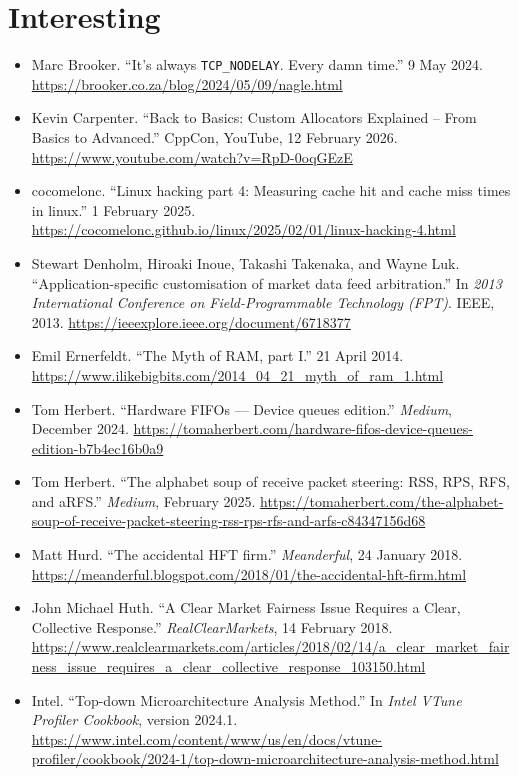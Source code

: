 \documentclass{article}
\begin{document}
\section{Interesting}
\begin{itemize}
	\item Marc Brooker. ``It's always \texttt{TCP\_NODELAY}. Every damn time.'' 9 May 2024. \url{https://brooker.co.za/blog/2024/05/09/nagle.html}
	\item Kevin Carpenter. ``Back to Basics: Custom Allocators Explained -- From Basics to Advanced.'' CppCon, YouTube, 12 February 2026. \url{https://www.youtube.com/watch?v=RpD-0oqGEzE}
	\item cocomelonc. ``Linux hacking part 4: Measuring cache hit and cache miss times in linux.'' 1 February 2025. \url{https://cocomelonc.github.io/linux/2025/02/01/linux-hacking-4.html}
	\item Stewart Denholm, Hiroaki Inoue, Takashi Takenaka, and Wayne Luk. ``Application-specific customisation of market data feed arbitration.'' In \textit{2013 International Conference on Field-Programmable Technology (FPT)}. IEEE, 2013. \url{https://ieeexplore.ieee.org/document/6718377}
	\item Emil Ernerfeldt. ``The Myth of RAM, part I.'' 21 April 2014. \url{https://www.ilikebigbits.com/2014_04_21_myth_of_ram_1.html}
	\item Tom Herbert. ``Hardware FIFOs --- Device queues edition.'' \textit{Medium}, December 2024. \url{https://tomaherbert.com/hardware-fifos-device-queues-edition-b7b4ec16b0a9}
	\item Tom Herbert. ``The alphabet soup of receive packet steering: RSS, RPS, RFS, and aRFS.'' \textit{Medium}, February 2025. \url{https://tomaherbert.com/the-alphabet-soup-of-receive-packet-steering-rss-rps-rfs-and-arfs-c84347156d68}
	\item Matt Hurd. ``The accidental HFT firm.'' \textit{Meanderful}, 24 January 2018. \url{https://meanderful.blogspot.com/2018/01/the-accidental-hft-firm.html}
	\item John Michael Huth. ``A Clear Market Fairness Issue Requires a Clear, Collective Response.'' \textit{RealClearMarkets}, 14 February 2018. \url{https://www.realclearmarkets.com/articles/2018/02/14/a_clear_market_fairness_issue_requires_a_clear_collective_response_103150.html}
	\item Intel. ``Top-down Microarchitecture Analysis Method.'' In \textit{Intel VTune Profiler Cookbook}, version 2024.1. \url{https://www.intel.com/content/www/us/en/docs/vtune-profiler/cookbook/2024-1/top-down-microarchitecture-analysis-method.html}

\end{itemize}
\end{document}
